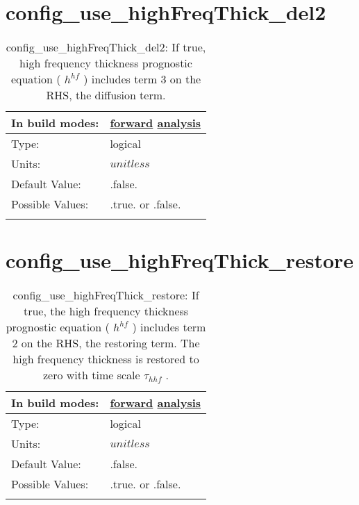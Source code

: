 \section[config\_use\_highFreqThick\_del2]{config\_use\_highFreqThick\_del2}
\label{sec:nm_sec_config_use_highFreqThick_del2}
\begin{center}
\begin{longtable}{| p{2.0in} || p{4.0in} |}
    \hline
    In build modes: & \hyperref[subsec:forward_nm_tab_ALE_frequency_filtered_thickness]{forward} \hyperref[subsec:analysis_nm_tab_ALE_frequency_filtered_thickness]{analysis} \\
    \hline
    Type: & logical \\
    \hline
    Units: & $unitless$ \\
    \hline
    Default Value: & .false. \\
    \hline
    Possible Values: & .true. or .false. \\
    \hline
    \caption{config\_use\_highFreqThick\_del2:  If true, high frequency thickness prognostic equation ( $h^{hf}$ ) includes term 3 on the RHS, the diffusion term.}
\end{longtable}
\end{center}
\section[config\_use\_highFreqThick\_restore]{config\_use\_highFreqThick\_restore}
\label{sec:nm_sec_config_use_highFreqThick_restore}
\begin{center}
\begin{longtable}{| p{2.0in} || p{4.0in} |}
    \hline
    In build modes: & \hyperref[subsec:forward_nm_tab_ALE_frequency_filtered_thickness]{forward} \hyperref[subsec:analysis_nm_tab_ALE_frequency_filtered_thickness]{analysis} \\
    \hline
    Type: & logical \\
    \hline
    Units: & $unitless$ \\
    \hline
    Default Value: & .false. \\
    \hline
    Possible Values: & .true. or .false. \\
    \hline
    \caption{config\_use\_highFreqThick\_restore:  If true, the high frequency thickness prognostic equation ( $h^{hf}$ ) includes term 2 on the RHS, the restoring term.  The high frequency thickness is restored to zero with time scale  $\tau_{hhf}$ .}
\end{longtable}
\end{center}
